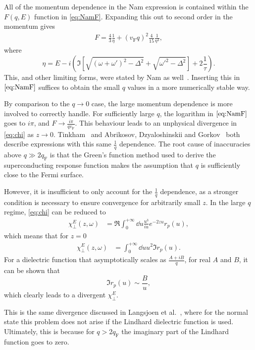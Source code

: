 \documentclass{article}
\newcommand{\vf}{v_{\mathrm{F}}}
\begin{document}
All of the momentum dependence in the Nam expression is contained within the $F(q, E)$ function in \eqref{eq:NamF}.
Expanding this out to second order in the momentum gives
\begin{align}
	F = \frac43 \frac{1}{\eta} + (\vf q)^2\frac{4}{15} \frac{1}{\eta^3},
\end{align}
where
\begin{equation}
	\eta = E - i \left(\Im[\sqrt{(\omega + \omega')^2 - \Delta^2} + \sqrt{\omega'^2 - \Delta^2}] + 2 \frac{1}{\tau} \right).
\end{equation}
This, and other limiting forms, were stated by Nam as well~\cite{Nam1967}.
Inserting this in $\eqref{eq:NamF}$ suffices to obtain the small $q$ values in a more numerically stable way.

By comparison to the $q \rightarrow 0$ case, the large momentum dependence is more involved to correctly handle.
For sufficiently large $q$, the logarithm in $\eqref{eq:NamF}$ goes to $i \pi$, and $F \rightarrow \frac{i \pi}{q \vf}$.
This behaviour leads to an unphysical divergence in \eqref{eq:chi} as $z \rightarrow 0$.
Tinkham~\cite{Tinkham} and Abrikosov, Dzyaloshinskii and Gorkov~\cite{AGD} both describe expressions with this same $\frac{1}{q}$ dependence.
The root cause of inaccuracies above $q \gg 2 q_{\mathrm{F}}$ is that the Green's function method used to derive the superconducting response function makes the assumption that $q$ is sufficiently close to the Fermi surface.

However, it is insufficient to only account for the $\frac{1}{q}$ dependence, as a stronger condition is necessary to ensure convergence for arbitrarily small $z$.
In the large $q$ regime, \eqref{eq:chi} can be reduced to
\begin{align}
	\chi_\perp^E(z, \omega) &= \Re \int_0^{+\infty} \dd{u} \frac{u^3}{i u} e^{-2 z u} r_p(u),
\end{align}
which means that for $z = 0$
\begin{align}
	\chi_\perp^E(z, \omega) &= \int_0^{+\infty} \dd{u} u^2 \Im r_p(u).
\end{align}
For a dielectric function that asymptotically scales as $\frac{A + i B}{q}$, for real $A$ and $B$, it can be shown that
\begin{equation}
	\Im r_p(u) \sim \frac{B}{u},
\end{equation}
which clearly leads to a divergent $\chi_\perp^E$.

This is the same divergence discussed in Langsjoen et al.~\cite{QubitRelax}, where for the normal state this problem does not arise if the Lindhard dielectric function is used.
Ultimately, this is because for $q > 2 q_{\mathrm{F}}$ the imaginary part of the Lindhard function goes to zero.
\end{document}
